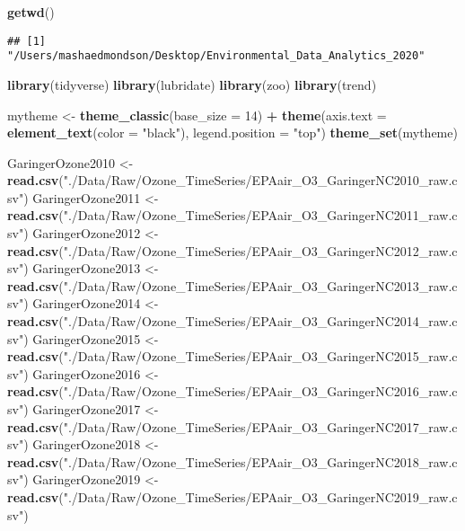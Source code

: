 \documentclass[]{article}
\newenvironment{Shaded}{\begin{snugshade}}{\end{snugshade}}
\newcommand{\DataTypeTok}[1]{\textcolor[rgb]{0.13,0.29,0.53}{#1}}
\newcommand{\DecValTok}[1]{\textcolor[rgb]{0.00,0.00,0.81}{#1}}
\newcommand{\KeywordTok}[1]{\textcolor[rgb]{0.13,0.29,0.53}{\textbf{#1}}}
\newcommand{\NormalTok}[1]{#1}
\newcommand{\OperatorTok}[1]{\textcolor[rgb]{0.81,0.36,0.00}{\textbf{#1}}}
\newcommand{\StringTok}[1]{\textcolor[rgb]{0.31,0.60,0.02}{#1}}
\begin{document}
\begin{Shaded}
\begin{Highlighting}[]
\KeywordTok{getwd}\NormalTok{()}
\end{Highlighting}
\end{Shaded}

\begin{verbatim}
## [1] "/Users/mashaedmondson/Desktop/Environmental_Data_Analytics_2020"
\end{verbatim}

\begin{Shaded}
\begin{Highlighting}[]
\KeywordTok{library}\NormalTok{(tidyverse)}
\KeywordTok{library}\NormalTok{(lubridate)}
\KeywordTok{library}\NormalTok{(zoo)}
\KeywordTok{library}\NormalTok{(trend)}

\NormalTok{mytheme <-}\StringTok{ }\KeywordTok{theme_classic}\NormalTok{(}\DataTypeTok{base_size =} \DecValTok{14}\NormalTok{) }\OperatorTok{+}
\StringTok{  }\KeywordTok{theme}\NormalTok{(}\DataTypeTok{axis.text =} \KeywordTok{element_text}\NormalTok{(}\DataTypeTok{color =} \StringTok{"black"}\NormalTok{), }
        \DataTypeTok{legend.position =} \StringTok{"top"}\NormalTok{)}
\KeywordTok{theme_set}\NormalTok{(mytheme)}

\NormalTok{GaringerOzone2010 <-}\StringTok{ }\KeywordTok{read.csv}\NormalTok{(}\StringTok{"./Data/Raw/Ozone_TimeSeries/EPAair_O3_GaringerNC2010_raw.csv"}\NormalTok{)}
\NormalTok{GaringerOzone2011 <-}\StringTok{ }\KeywordTok{read.csv}\NormalTok{(}\StringTok{"./Data/Raw/Ozone_TimeSeries/EPAair_O3_GaringerNC2011_raw.csv"}\NormalTok{)}
\NormalTok{GaringerOzone2012 <-}\StringTok{ }\KeywordTok{read.csv}\NormalTok{(}\StringTok{"./Data/Raw/Ozone_TimeSeries/EPAair_O3_GaringerNC2012_raw.csv"}\NormalTok{)}
\NormalTok{GaringerOzone2013 <-}\StringTok{ }\KeywordTok{read.csv}\NormalTok{(}\StringTok{"./Data/Raw/Ozone_TimeSeries/EPAair_O3_GaringerNC2013_raw.csv"}\NormalTok{)}
\NormalTok{GaringerOzone2014 <-}\StringTok{ }\KeywordTok{read.csv}\NormalTok{(}\StringTok{"./Data/Raw/Ozone_TimeSeries/EPAair_O3_GaringerNC2014_raw.csv"}\NormalTok{)}
\NormalTok{GaringerOzone2015 <-}\StringTok{ }\KeywordTok{read.csv}\NormalTok{(}\StringTok{"./Data/Raw/Ozone_TimeSeries/EPAair_O3_GaringerNC2015_raw.csv"}\NormalTok{)}
\NormalTok{GaringerOzone2016 <-}\StringTok{ }\KeywordTok{read.csv}\NormalTok{(}\StringTok{"./Data/Raw/Ozone_TimeSeries/EPAair_O3_GaringerNC2016_raw.csv"}\NormalTok{)}
\NormalTok{GaringerOzone2017 <-}\StringTok{ }\KeywordTok{read.csv}\NormalTok{(}\StringTok{"./Data/Raw/Ozone_TimeSeries/EPAair_O3_GaringerNC2017_raw.csv"}\NormalTok{)}
\NormalTok{GaringerOzone2018 <-}\StringTok{ }\KeywordTok{read.csv}\NormalTok{(}\StringTok{"./Data/Raw/Ozone_TimeSeries/EPAair_O3_GaringerNC2018_raw.csv"}\NormalTok{)}
\NormalTok{GaringerOzone2019 <-}\StringTok{ }\KeywordTok{read.csv}\NormalTok{(}\StringTok{"./Data/Raw/Ozone_TimeSeries/EPAair_O3_GaringerNC2019_raw.csv"}\NormalTok{)}
\end{Highlighting}
\end{Shaded}
\end{document}
